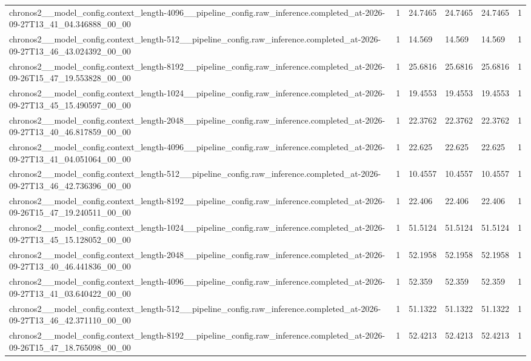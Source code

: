 \begin{tabular}{llllll}
chronos2\_\_model\_config.context\_length-4096\_\_pipeline\_config.raw\_inference.completed\_at-2026-09-27T13\_41\_04.346888\_00\_00 & 1 & 24.7465 & 24.7465 & 24.7465 & 1 \\
chronos2\_\_model\_config.context\_length-512\_\_pipeline\_config.raw\_inference.completed\_at-2026-09-27T13\_46\_43.024392\_00\_00 & 1 & 14.569 & 14.569 & 14.569 & 1 \\
chronos2\_\_model\_config.context\_length-8192\_\_pipeline\_config.raw\_inference.completed\_at-2026-09-26T15\_47\_19.553828\_00\_00 & 1 & 25.6816 & 25.6816 & 25.6816 & 1 \\
chronos2\_\_model\_config.context\_length-1024\_\_pipeline\_config.raw\_inference.completed\_at-2026-09-27T13\_45\_15.490597\_00\_00 & 1 & 19.4553 & 19.4553 & 19.4553 & 1 \\
chronos2\_\_model\_config.context\_length-2048\_\_pipeline\_config.raw\_inference.completed\_at-2026-09-27T13\_40\_46.817859\_00\_00 & 1 & 22.3762 & 22.3762 & 22.3762 & 1 \\
chronos2\_\_model\_config.context\_length-4096\_\_pipeline\_config.raw\_inference.completed\_at-2026-09-27T13\_41\_04.051064\_00\_00 & 1 & 22.625 & 22.625 & 22.625 & 1 \\
chronos2\_\_model\_config.context\_length-512\_\_pipeline\_config.raw\_inference.completed\_at-2026-09-27T13\_46\_42.736396\_00\_00 & 1 & 10.4557 & 10.4557 & 10.4557 & 1 \\
chronos2\_\_model\_config.context\_length-8192\_\_pipeline\_config.raw\_inference.completed\_at-2026-09-26T15\_47\_19.240511\_00\_00 & 1 & 22.406 & 22.406 & 22.406 & 1 \\
chronos2\_\_model\_config.context\_length-1024\_\_pipeline\_config.raw\_inference.completed\_at-2026-09-27T13\_45\_15.128052\_00\_00 & 1 & 51.5124 & 51.5124 & 51.5124 & 1 \\
chronos2\_\_model\_config.context\_length-2048\_\_pipeline\_config.raw\_inference.completed\_at-2026-09-27T13\_40\_46.441836\_00\_00 & 1 & 52.1958 & 52.1958 & 52.1958 & 1 \\
chronos2\_\_model\_config.context\_length-4096\_\_pipeline\_config.raw\_inference.completed\_at-2026-09-27T13\_41\_03.640422\_00\_00 & 1 & 52.359 & 52.359 & 52.359 & 1 \\
chronos2\_\_model\_config.context\_length-512\_\_pipeline\_config.raw\_inference.completed\_at-2026-09-27T13\_46\_42.371110\_00\_00 & 1 & 51.1322 & 51.1322 & 51.1322 & 1 \\
chronos2\_\_model\_config.context\_length-8192\_\_pipeline\_config.raw\_inference.completed\_at-2026-09-26T15\_47\_18.765098\_00\_00 & 1 & 52.4213 & 52.4213 & 52.4213 & 1 \\

\end{tabular}
